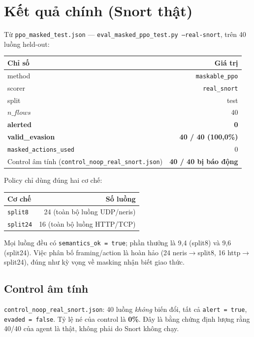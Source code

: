 \documentclass[12pt,a4paper]{report}
\begin{document}
\section{Kết quả chính (Snort thật)}

Từ \texttt{ppo\_masked\_test.json} — \texttt{eval\_masked\_ppo\_test.py --real-snort},
trên 40 luồng held-out:

\begin{center}
\begin{tabular}{lr}
\toprule
Chỉ số & Giá trị \\
\midrule
method & \texttt{maskable\_ppo} \\
scorer & \texttt{real\_snort} \\
split & test \\
$n\_flows$ & 40 \\
\textbf{alerted} & \textbf{0} \\
\textbf{valid\_evasion} & \textbf{40 / 40 (100{,}0\%)} \\
\texttt{masked\_actions\_used} & 0 \\
Control âm tính (\texttt{control\_noop\_real\_snort.json}) & \textbf{40 / 40 bị báo động} \\
\bottomrule
\end{tabular}
\end{center}

Policy chỉ dùng đúng hai cơ chế:
\begin{center}
\begin{tabular}{lr}
\toprule
Cơ chế & Số luồng \\
\midrule
\texttt{split8}  & 24 (toàn bộ luồng UDP/neris) \\
\texttt{split24} & 16 (toàn bộ luồng HTTP/TCP) \\
\bottomrule
\end{tabular}
\end{center}
Mọi luồng đều có \texttt{semantics\_ok = true}; phần thưởng là 9{,}4 (split8) và 9{,}6
(split24). Việc phân bố framing/action là hoàn hảo (24 neris$\to$split8, 16 http$\to$split24),
đúng như kỳ vọng về masking nhận biết giao thức.

\subsection{Control âm tính}
\texttt{control\_noop\_real\_snort.json}: 40 luồng \emph{không} biến đổi, tất cả
\texttt{alert = true}, \texttt{evaded = false}. Tỷ lệ né của control là \textbf{0\%}.
Đây là bằng chứng định lượng rằng 40/40 của agent là thật, không phải do Snort không
chạy.
\end{document}
